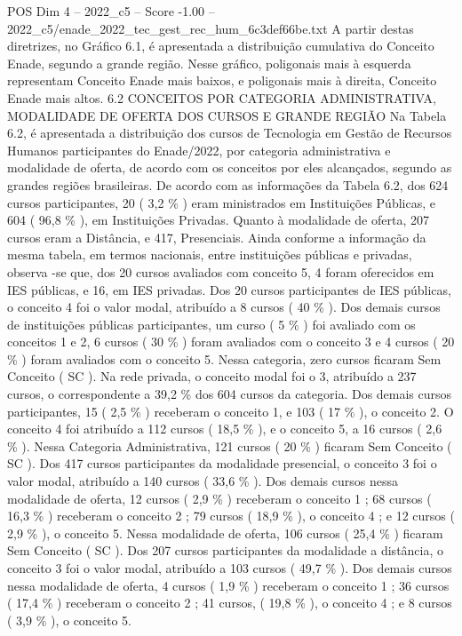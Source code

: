 \begin{textsample}{POS Dim 4 – 2022\_c5 – Score -1.00 – 2022\_c5/enade\_2022\_tec\_gest\_rec\_hum\_6c3def66be.txt}
A partir destas diretrizes, no Gráfico 6.1, é apresentada a distribuição cumulativa do Conceito Enade, segundo a grande região.
Nesse gráfico, poligonais mais à esquerda representam Conceito Enade mais baixos, e poligonais mais à direita, Conceito Enade mais altos. 6.2 CONCEITOS POR CATEGORIA ADMINISTRATIVA, MODALIDADE DE OFERTA DOS CURSOS E GRANDE REGIÃO Na Tabela 6.2, é apresentada a distribuição dos cursos de Tecnologia em Gestão de Recursos Humanos participantes do Enade/2022, por categoria administrativa e modalidade de oferta, de acordo com os conceitos por eles alcançados, segundo as grandes regiões brasileiras.
De acordo com as informações da Tabela 6.2, dos 624 cursos participantes, 20 ( 3,2 \% ) eram ministrados em Instituições Públicas, e 604 ( 96,8 \% ), em Instituições Privadas.
Quanto à modalidade de oferta, 207 cursos eram a Distância, e 417, Presenciais.
Ainda conforme a informação da mesma tabela, em termos nacionais, entre instituições públicas e privadas, observa -se que, dos 20 cursos avaliados com conceito 5, 4 foram oferecidos em IES públicas, e 16, em IES privadas.
Dos 20 cursos participantes de IES públicas, o conceito 4 foi o valor modal, atribuído a 8 cursos ( 40 \% ).
Dos demais cursos de instituições públicas participantes, um curso ( 5 \% ) foi avaliado com os conceitos 1 e 2, 6 cursos ( 30 \% ) foram avaliados com o conceito 3 e 4 cursos ( 20 \% ) foram avaliados com o conceito 5.
Nessa categoria, zero cursos ficaram Sem Conceito ( SC ).
Na rede privada, o conceito modal foi o 3, atribuído a 237 cursos, o correspondente a 39,2 \% dos 604 cursos da categoria.
Dos demais cursos participantes, 15 ( 2,5 \% ) receberam o conceito 1, e 103 ( 17 \% ), o conceito 2.
O conceito 4 foi atribuído a 112 cursos ( 18,5 \% ), e o conceito 5, a 16 cursos ( 2,6 \% ).
Nessa Categoria Administrativa, 121 cursos ( 20 \% ) ficaram Sem Conceito ( SC ).
Dos 417 cursos participantes da modalidade presencial, o conceito 3 foi o valor modal, atribuído a 140 cursos ( 33,6 \% ).
Dos demais cursos nessa modalidade de oferta, 12 cursos ( 2,9 \% ) receberam o conceito 1 ; 68 cursos ( 16,3 \% ) receberam o conceito 2 ; 79 cursos ( 18,9 \% ), o conceito 4 ; e 12 cursos ( 2,9 \% ), o conceito 5.
Nessa modalidade de oferta, 106 cursos ( 25,4 \% ) ficaram Sem Conceito ( SC ).
Dos 207 cursos participantes da modalidade a distância, o conceito 3 foi o valor modal, atribuído a 103 cursos ( 49,7 \% ).
Dos demais cursos nessa modalidade de oferta, 4 cursos ( 1,9 \% ) receberam o conceito 1 ; 36 cursos ( 17,4 \% ) receberam o conceito 2 ; 41 cursos, ( 19,8 \% ), o conceito 4 ; e 8 cursos ( 3,9 \% ), o conceito 5.

\end{textsample}
